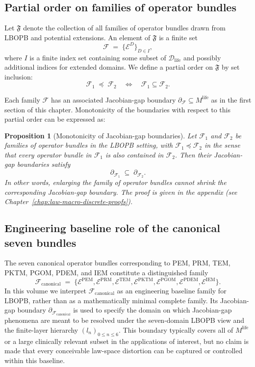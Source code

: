 \documentclass[11pt]{book}
\theoremstyle{plain}
\newtheorem{proposition}[theorem]{Proposition}
\theoremstyle{definition}
\theoremstyle{remark}
\begin{document}
\subsection*{Partial order on families of operator bundles}

Let $\mathfrak{F}$ denote the collection of all families of operator
bundles drawn from LBOPB and potential extensions. An element of
$\mathfrak{F}$ is a finite set
\[
  \mathcal{F} \;=\; \{\mathcal{E}^{D}\}_{D \in I},
\]
where $I$ is a finite index set containing some subset of
$\mathcal{D}_{\mathrm{life}}$ and possibly additional indices for
extended domains. We define a partial order on $\mathfrak{F}$ by
set inclusion:
\[
  \mathcal{F}_{1} \;\preceq\; \mathcal{F}_{2}
  \quad\Longleftrightarrow\quad
  \mathcal{F}_{1} \subseteq \mathcal{F}_{2}.
\]

Each family $\mathcal{F}$ has an associated Jacobian-gap boundary
$\partial_{\mathcal{F}} \subseteq M^{\mathrm{life}}$ as in the first
section of this chapter. Monotonicity of the boundaries with respect
to this partial order can be expressed as:

\begin{proposition}[Monotonicity of Jacobian-gap boundaries]
\label{prop:jacobian-gap-monotone}
Let $\mathcal{F}_{1}$ and $\mathcal{F}_{2}$ be families of operator
bundles in the LBOPB setting, with $\mathcal{F}_{1} \preceq
\mathcal{F}_{2}$ in the sense that every operator bundle in
$\mathcal{F}_{1}$ is also contained in $\mathcal{F}_{2}$. Then their
Jacobian-gap boundaries satisfy
\[
  \partial_{\mathcal{F}_{1}}
  \;\subseteq\;
  \partial_{\mathcal{F}_{2}}.
\]
In other words, enlarging the family of operator bundles cannot shrink
the corresponding Jacobian-gap boundary. The proof is given in the
appendix (see Chapter~\ref{chap:law-macro-discrete-proofs}).
\end{proposition}

\subsection*{Engineering baseline role of the canonical seven bundles}

The seven canonical operator bundles corresponding to PEM, PRM, TEM,
PKTM, PGOM, PDEM, and IEM constitute a distinguished family
\[
  \mathcal{F}_{\mathrm{canonical}}
  \;=\;
  \{\mathcal{E}^{\mathrm{PEM}},
    \mathcal{E}^{\mathrm{PRM}},
    \mathcal{E}^{\mathrm{TEM}},
    \mathcal{E}^{\mathrm{PKTM}},
    \mathcal{E}^{\mathrm{PGOM}},
    \mathcal{E}^{\mathrm{PDEM}},
    \mathcal{E}^{\mathrm{IEM}}\}.
\]
In this volume we interpret $\mathcal{F}_{\mathrm{canonical}}$ as an
engineering baseline family for LBOPB, rather than as a mathematically
minimal complete family.
Its Jacobian-gap boundary
$\partial_{\mathcal{F}_{\mathrm{canonical}}}$ is used to specify the
domain on which Jacobian-gap phenomena are meant to be resolved under
the seven-domain LBOPB view and the finite-layer hierarchy
$(l_n)_{0\le n\le 6}$.
This boundary typically covers all of $M^{\mathrm{life}}$ or a large
clinically relevant subset in the applications of interest, but no
claim is made that every conceivable law-space distortion can be
captured or controlled within this baseline.
\end{document}

